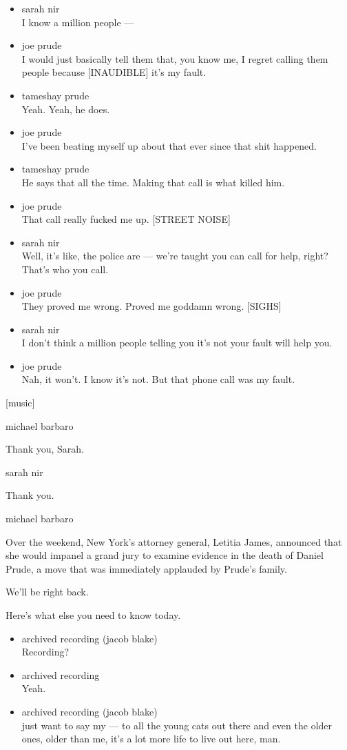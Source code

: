 \begin{itemize}
\item
  sarah nir\\
  I know a million people ---
\item
  joe prude\\
  I would just basically tell them that, you know me, I regret calling
  them people because {[}INAUDIBLE{]} it's my fault.
\item
  tameshay prude\\
  Yeah. Yeah, he does.
\item
  joe prude\\
  I've been beating myself up about that ever since that shit happened.
\item
  tameshay prude\\
  He says that all the time. Making that call is what killed him.
\item
  joe prude\\
  That call really fucked me up. {[}STREET NOISE{]}
\item
  sarah nir\\
  Well, it's like, the police are --- we're taught you can call for
  help, right? That's who you call.
\item
  joe prude\\
  They proved me wrong. Proved me goddamn wrong. {[}SIGHS{]}
\item
  sarah nir\\
  I don't think a million people telling you it's not your fault will
  help you.
\item
  joe prude\\
  Nah, it won't. I know it's not. But that phone call was my fault.
\end{itemize}

{[}music{]}

michael barbaro

Thank you, Sarah.

sarah nir

Thank you.

michael barbaro

Over the weekend, New York's attorney general, Letitia James, announced
that she would impanel a grand jury to examine evidence in the death of
Daniel Prude, a move that was immediately applauded by Prude's family.

We'll be right back.

Here's what else you need to know today.

\begin{itemize}
\item
  archived recording (jacob blake)\\
  Recording?
\item
  archived recording\\
  Yeah.
\item
  archived recording (jacob blake)\\
  just want to say my --- to all the young cats out there and even the
  older ones, older than me, it's a lot more life to live out here, man.
\end{itemize}


